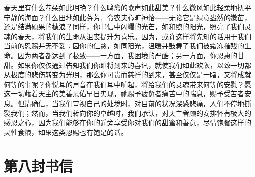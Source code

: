 春天里有什么花朵如此明艳？什么鸣禽的歌声如此甜美？什么微风如此轻柔地抚平宁静的海面？什么田地如此芬芳，令农夫心旷神怡——无论它是绿意盎然的嫩苗，还是结满硕果的穗浪？同样，你书信中闪耀的光芒，如和煦的阳光，照亮了我们灵魂的春天，将我们的生命从沮丧提升为喜乐。因为，或许这样将先知的话用于我们当前的恩赐并无不妥：因你的仁慈，如同阳光，温暖并鼓舞了我们被霜冻摧残的生命。因为两者都达到了极致——一方面，我困境的严酷；另一方面，你恩惠的甘甜。如果你仅仅通过告知我们你即将到来的喜讯，就使我们如此欢欣，以致一切都从极度的悲伤转变为光明，那么你可贵而慈祥的到来，甚至仅仅是一睹，又将成就何等的事呢？你悦耳的声音在我们耳中响起，将给我们的灵魂带来何等的安慰？愿这一切藉着天主的美善恩佑早日实现，祂赐予疲惫者痛苦中的喘息，赐予受苦者安息。但请确信，当我们审视自己的处境时，对目前的状况深感悲痛，人们不停地撕裂我们；然而，当我们转向你的卓越时，我们承认，对天主眷顾的安排怀有极大的感恩之心，因为我们能够在你的近旁享受你对我们的甜蜜和善意，尽情饱餐这样的灵性食粮，如果这类恩赐也有饱足的话。\par



\section{第八封书信}

\par

\par

